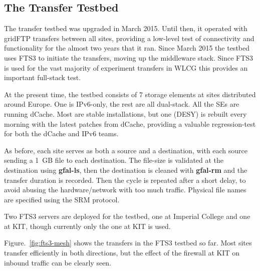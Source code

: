 \subsection{The Transfer Testbed}
The transfer testbed was upgraded in March 2015. Until then, it operated with gridFTP transfers between all sites, providing a low-level test of connectivity and functionality for the almost two years that it ran. Since March 2015 the testbed uses FTS3 to initiate the transfers, moving up the middleware stack. Since FTS3 is used for the vast majority of experiment transfers in WLCG this provides an important full-stack test.

At the present time, the testbed consists of 7 storage elements at sites distributed around Europe. One is IPv6-only, the rest are all dual-stack. All the SEs are running dCache. Most are stable installations, but one (DESY) is rebuilt every morning with the latest patches from dCache, providing a valuable regression-test for both the dCache and IPv6 teams.

As before, each site serves as both a source and a destination, with each source sending a 1~GB file to each destination. The file-size is validated at the destination using {\bf gfal-ls}, then the destination is cleaned with {\bf gfal-rm} and the transfer duration is recorded. Then the cycle is repeated after a short delay, to avoid abusing the hardware/network with too much traffic. Physical file names are specified using the SRM protocol.

Two FTS3 servers are deployed for the testbed, one at Imperial College and one at KIT, though currently only the one at KIT is used.

Figure.~\ref{fig:fts3-mesh} shows the transfers in the FTS3 testbed so far. Most sites transfer efficiently in both directions, but the effect of the firewall at KIT on inbound traffic can be clearly seen.

